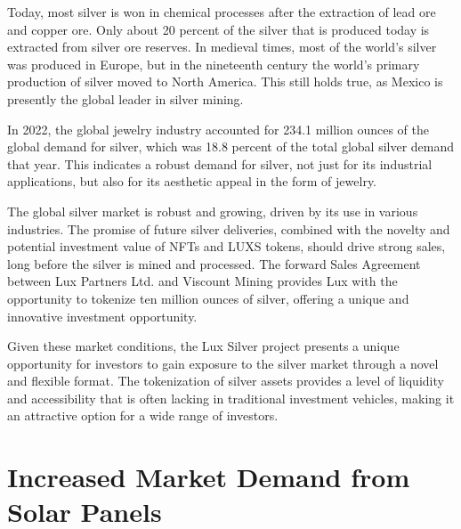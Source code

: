\documentclass[11pt]{article}
\begin{document}
Today, most silver is won in chemical processes after the extraction of lead ore and copper ore. Only about 20 percent of the silver that is produced today is extracted from silver ore reserves. In medieval times, most of the world's silver was produced in Europe, but in the nineteenth century the world's primary production of silver moved to North America. This still holds true, as Mexico is presently the global leader in silver mining.


In 2022, the global jewelry industry accounted for 234.1 million ounces of the global demand for silver, which was 18.8 percent of the total global silver demand that year. This indicates a robust demand for silver, not just for its industrial applications, but also for its aesthetic appeal in the form of jewelry.


The global silver market is robust and growing, driven by its use in various industries. The promise of future silver deliveries, combined with the novelty and potential investment value of NFTs and LUXS tokens, should drive strong sales, long before the silver is mined and processed. The forward Sales Agreement between Lux Partners Ltd. and Viscount Mining provides Lux with the opportunity to tokenize ten million ounces of silver, offering a unique and innovative investment opportunity.


Given these market conditions, the Lux Silver project presents a unique opportunity for investors to gain exposure to the silver market through a novel and flexible format. The tokenization of silver assets provides a level of liquidity and accessibility that is often lacking in traditional investment vehicles, making it an attractive option for a wide range of investors.


\section{Increased Market Demand from Solar Panels}
\end{document}
